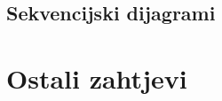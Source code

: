 				
			\subsection{Sekvencijski dijagrami}
				
%				
	
		\section{Ostali zahtjevi}
		
%		 
			 
			 
			 
	